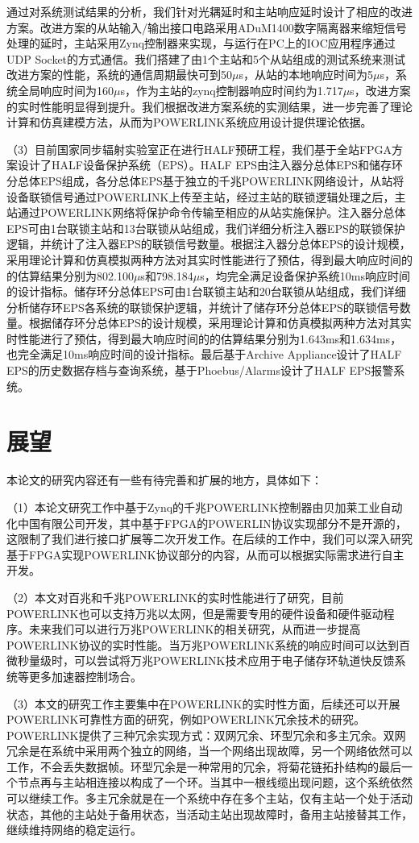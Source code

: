 通过对系统测试结果的分析，我们针对光耦延时和主站响应延时设计了相应的改进方案。改进方案的从站输入/输出接口电路采用ADuM1400数字隔离器来缩短信号处理的延时，主站采用Zynq控制器来实现，与运行在PC上的IOC应用程序通过UDP Socket的方式通信。我们搭建了由1个主站和5个从站组成的测试系统来测试改进方案的性能，系统的通信周期最快可到50$\mu$s，从站的本地响应时间为5$\mu$s，系统全局响应时间为160$\mu$s，作为主站的zynq控制器响应时间约为1.717$\mu$s，改进方案的实时性能明显得到提升。我们根据改进方案系统的实测结果，进一步完善了理论计算和仿真建模方法，从而为POWERLINK系统应用设计提供理论依据。


（3）目前国家同步辐射实验室正在进行HALF预研工程，我们基于全站FPGA方案设计了HALF设备保护系统（EPS）。HALF EPS由注入器分总体EPS和储存环分总体EPS组成，各分总体EPS基于独立的千兆POWERLINK网络设计，从站将设备联锁信号通过POWERLINK上传至主站，经过主站的联锁逻辑处理之后，主站通过POWERLINK网络将保护命令传输至相应的从站实施保护。注入器分总体EPS可由1台联锁主站和13台联锁从站组成，我们详细分析注入器EPS的联锁保护逻辑，并统计了注入器EPS的联锁信号数量。根据注入器分总体EPS的设计规模，采用理论计算和仿真模拟两种方法对其实时性能进行了预估，得到最大响应时间的的估算结果分别为802.100$\mu$s和798.184$\mu$s，均完全满足设备保护系统10ms响应时间的设计指标。储存环分总体EPS可由1台联锁主站和20台联锁从站组成，我们详细分析储存环EPS各系统的联锁保护逻辑，并统计了储存环分总体EPS的联锁信号数量。根据储存环分总体EPS的设计规模，采用理论计算和仿真模拟两种方法对其实时性能进行了预估，得到最大响应时间的的估算结果分别为1.643ms和1.634ms，也完全满足10ms响应时间的设计指标。最后基于Archive Appliance设计了HALF EPS的历史数据存档与查询系统，基于Phoebus/Alarms设计了HALF EPS报警系统。



\section{展望}

本论文的研究内容还有一些有待完善和扩展的地方，具体如下：

（1）本论文研究工作中基于Zynq的千兆POWERLINK控制器由贝加莱工业自动化中国有限公司开发，其中基于FPGA的POWERLIN协议实现部分不是开源的，这限制了我们进行接口扩展等二次开发工作。在后续的工作中，我们可以深入研究基于FPGA实现POWERLINK协议部分的内容，从而可以根据实际需求进行自主开发。

（2）本文对百兆和千兆POWERLINK的实时性能进行了研究，目前POWERLINK也可以支持万兆以太网，但是需要专用的硬件设备和硬件驱动程序。未来我们可以进行万兆POWERLINK的相关研究，从而进一步提高POWERLINK协议的实时性能。当万兆POWERLINK系统的响应时间可以达到百微秒量级时，可以尝试将万兆POWERLINK技术应用于电子储存环轨道快反馈系统等更多加速器控制场合\cite{Shao2019,Tian-2015}。

（3）本文的研究工作主要集中在POWERLINK的实时性方面，后续还可以开展POWERLINK可靠性方面的研究，例如POWERLINK冗余技术的研究。POWERLINK提供了三种冗余实现方式：双网冗余、环型冗余和多主冗余。双网冗余是在系统中采用两个独立的网络，当一个网络出现故障，另一个网络依然可以工作，不会丢失数据帧。环型冗余是一种常用的冗余，将菊花链拓扑结构的最后一个节点再与主站相连接以构成了一个环。当其中一根线缆出现问题，这个系统依然可以继续工作。多主冗余就是在一个系统中存在多个主站，仅有主站一个处于活动状态，其他的主站处于备用状态，当活动主站出现故障时，备用主站接替其工作，继续维持网络的稳定运行。


